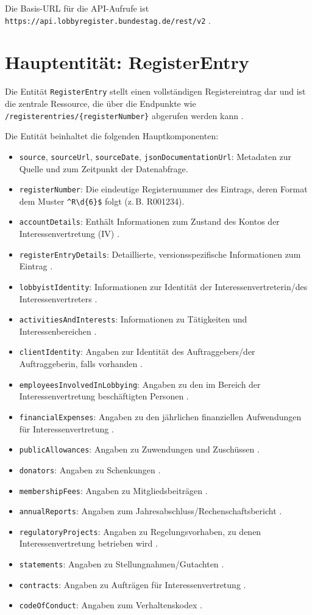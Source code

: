 \documentclass[12pt,twoside=false,a4paper,parskip]{scrbook}
\begin{document}
Die Basis-URL für die API-Aufrufe ist \texttt{https://api.lobbyregister.bundestag.de/rest/v2} .

\section{Hauptentität: RegisterEntry}

Die Entität \texttt{RegisterEntry} stellt einen vollständigen Registereintrag dar  und ist die zentrale Ressource, die über die Endpunkte wie \texttt{/registerentries/\{registerNumber\}} abgerufen werden kann .

Die Entität beinhaltet die folgenden Hauptkomponenten:
\begin{itemize}
\item \texttt{source}, \texttt{sourceUrl}, \texttt{sourceDate}, \texttt{jsonDocumentationUrl}: Metadaten zur Quelle und zum Zeitpunkt der Datenabfrage.
\item \texttt{registerNumber}: Die eindeutige Registernummer des Eintrags, deren Format dem Muster \verb|^R\d{6}$| folgt (z.\,B. R001234).
\item \texttt{accountDetails}: Enthält Informationen zum Zustand des Kontos der Interessenvertretung (IV) .
\item \texttt{registerEntryDetails}: Detaillierte, versionsspezifische Informationen zum Eintrag .
\item \texttt{lobbyistIdentity}: Informationen zur Identität der Interessenvertreterin/des Interessenvertreters .
\item \texttt{activitiesAndInterests}: Informationen zu Tätigkeiten und Interessenbereichen .
\item \texttt{clientIdentity}: Angaben zur Identität des Auftraggebers/der Auftraggeberin, falls vorhanden .
\item \texttt{employeesInvolvedInLobbying}: Angaben zu den im Bereich der Interessenvertretung beschäftigten Personen .
\item \texttt{financialExpenses}: Angaben zu den jährlichen finanziellen Aufwendungen für Interessenvertretung .
\item \texttt{publicAllowances}: Angaben zu Zuwendungen und Zuschüssen .
\item \texttt{donators}: Angaben zu Schenkungen .
\item \texttt{membershipFees}: Angaben zu Mitgliedsbeiträgen .
\item \texttt{annualReports}: Angaben zum Jahresabschluss/Rechenschaftsbericht .
\item \texttt{regulatoryProjects}: Angaben zu Regelungsvorhaben, zu denen Interessenvertretung betrieben wird .
\item \texttt{statements}: Angaben zu Stellungnahmen/Gutachten .
\item \texttt{contracts}: Angaben zu Aufträgen für Interessenvertretung .
\item \texttt{codeOfConduct}: Angaben zum Verhaltenskodex .
\end{itemize}
\end{document}

